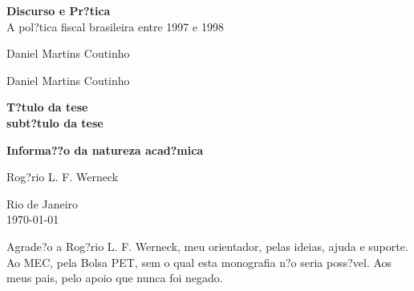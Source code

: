 \documentclass{article}
\renewcommand{\baselinestretch}{1.5}
\begin{document}
\thispagestyle{empty}
\phantom{----}
\vspace{4cm}
\begin{center}

\textbf{\LARGE{Discurso e Pr?tica}}\\
\Large{A pol?tica fiscal brasileira entre 1997 e 1998}

\vspace{3cm}

\Large{Daniel Martins Coutinho}

\end{center}

\newpage
\thispagestyle{empty}

\begin{flushright}


\Large \textsf{Daniel Martins Coutinho}\\

\bigskip
\bigskip
\bigskip

\renewcommand{\baselinestretch}{1}

\Large \textsf{\textbf {T?tulo da tese}}\\
\large \textsf{\textbf {subt?tulo da tese}}\\

\bigskip
\smallskip

\large \textsf{\textbf {Informa??o da natureza acad?mica}}\\

\renewcommand{\baselinestretch}{1.5}

\bigskip
\smallskip

\large \textsf{Rog?rio L. F. Werneck}\\

\bigskip
\bigskip

\large \textsf{Rio de Janeiro}\\
\large \textsf{\today}\\

\end{flushright}

\newpage
\thispagestyle{empty}

\begin{center}

Agrade?o a Rog?rio L. F. Werneck, meu orientador, pelas ideias, ajuda e suporte.
Ao MEC, pela Bolsa PET, sem o qual esta monografia n?o seria poss?vel. 
Aos meus pais, pelo apoio que nunca foi negado.

\end{center}
\end{document}
